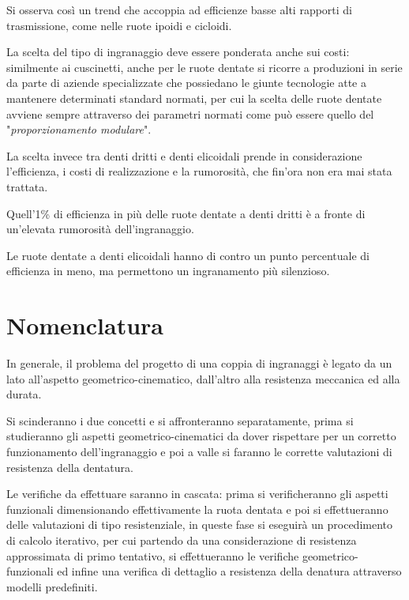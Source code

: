 \documentclass[a4paper, 15pt]{article}
\begin{document}
\begin{adjustwidth}{2in}{}
	Si osserva così un trend che accoppia ad efficienze basse alti rapporti di trasmissione, come nelle ruote ipoidi e cicloidi. \newline 
		
	La scelta del tipo di ingranaggio deve essere ponderata anche sui costi: similmente ai cuscinetti, anche per le ruote dentate si ricorre a produzioni in serie da parte di aziende specializzate che possiedano le giunte tecnologie atte a mantenere determinati standard normati, per cui la scelta delle ruote dentate avviene sempre attraverso dei parametri normati come può essere quello del "\textit{proporzionamento modulare}".\newline 
	
	La scelta invece tra denti dritti e denti elicoidali prende in considerazione l'efficienza, i costi di realizzazione e la rumorosità, che fin'ora non era mai stata trattata. 
	
	Quell'1\% di efficienza in più delle ruote dentate a denti dritti è a fronte di un'elevata rumorosità dell'ingranaggio. 
	
	Le ruote dentate a denti elicoidali hanno di contro un punto percentuale di efficienza in meno, ma permettono un ingranamento  più silenzioso. 
\end{adjustwidth}

\section{Nomenclatura}
\begin{adjustwidth}{2in}{}
	In generale, il problema del progetto di una coppia di ingranaggi è legato da un lato all’aspetto geometrico-cinematico, dall’altro alla resistenza meccanica ed alla durata.

Si scinderanno i due concetti e si affronteranno separatamente, prima si studieranno gli aspetti geometrico-cinematici da dover rispettare per un corretto funzionamento dell'ingranaggio e poi a valle si faranno le corrette valutazioni di resistenza della dentatura.

Le verifiche da effettuare saranno in cascata: prima si verificheranno gli aspetti funzionali dimensionando effettivamente la ruota dentata e poi si effettueranno delle valutazioni di tipo resistenziale, in queste fase si eseguirà un procedimento di calcolo iterativo, per cui partendo da una considerazione di resistenza approssimata di primo tentativo, si effettueranno le verifiche geometrico-funzionali ed infine una verifica di dettaglio a resistenza della denatura attraverso modelli predefiniti. 
\end{adjustwidth}
\end{document}
